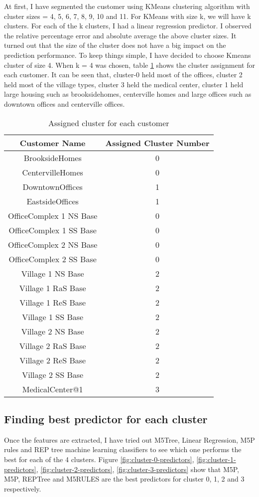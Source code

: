 At first, I have segmented the customer using KMeans clustering algorithm with cluster sizes = 4, 5, 6, 7, 8, 9, 10 and 11. For KMeans with size k, we will have k clusters. For each of the k clusters, I had a linear regression predictor. I observed the relative percentage error and absolute average the above cluster sizes. It turned out that the size of the cluster does not have a big impact on the prediction performance. To keep things simple, I have decided to choose Kmeans cluster of size 4. When k = 4 was chosen, table \ref{table:clusterAss} shows the cluster assignment for each customer. It can be seen that, cluster-0 held most of the offices, cluster 2 held most of the village types, cluster 3 held the medical center, cluster 1 held large housing such as brooksidehomes, centerville homes and large offices such as downtown offices and centerville offices.


\begin{table}[h!]
\centering
\caption{Assigned cluster for each customer}
\begin{tabular}{|c| c|} 
 \hline
 Customer Name & Assigned Cluster Number \\ [0.5ex] 
 \hline
BrooksideHomes &	0 \\
CentervilleHomes & 0 \\
DowntownOffices & 1	\\
EastsideOffices &	1 \\
OfficeComplex 1 NS Base &	0 \\
OfficeComplex 1 SS Base &	0 \\
OfficeComplex 2 NS Base &	0 \\
OfficeComplex 2 SS Base &	0 \\
Village 1 NS Base &	2 \\
Village 1 RaS Base &	2 \\
Village 1 ReS Base &	2 \\
Village 1 SS Base &	2 \\
Village 2 NS Base &	2 \\
Village 2 RaS Base &	2 \\
Village 2 ReS Base &	2 \\
Village 2 SS Base &	2 \\
MedicalCenter@1	& 3 \\ [1ex] 
 \hline
\end{tabular}
\label{table:clusterAss}
\end{table}

\subsection {Finding best predictor for each cluster}
Once the features are extracted, I have tried out  M5Tree, Linear Regression, M5P rules and REP tree machine learning classifiers to see which one performs the best for each of the 4 clusters. Figure \ref{fig:cluster-0-predictors}, \ref{fig:cluster-1-predictors}, \ref{fig:cluster-2-predictors}, \ref{fig:cluster-3-predictors} show that M5P, M5P, REPTree and M5RULES are the best predictors for cluster 0, 1, 2 and 3 respectively.

